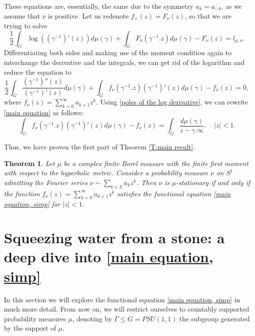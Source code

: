 \documentclass[11pt]{article}
\newtheorem{theorem}{Theorem}[section]
\begin{document}
These equations are, essentially, the same due to the symmetry $a_k = \overline{a_{-k}}$, as we assume that $\nu$ is positive. Let us redenote $f_+(z) = F_\nu(z)$, so that we are trying to solve
\begin{equation}
	\frac{1}{2} \int_G \log((\gamma^{-1})'(z))  d\mu(\gamma) + \int_G F_\nu(\gamma^{-1}.z)  d\mu(\gamma) - F_\nu(z) = l_{\mu, \nu}.
\end{equation}
Differentiating both sides and making use of the moment condition again to interchange the derivative and the integrals, we can get rid of the logarithm and reduce the equation to
\begin{equation}
	\label{main equation}
	\frac{1}{2} \int_G \frac{(\gamma^{-1})''(z)}{(\gamma^{-1})'(z)}  d\mu(\gamma) + \int_G f_\nu(\gamma^{-1}.z)(\gamma^{-1})'(z)  d\mu(\gamma) - f_\nu(z) = 0,
\end{equation}
where $f_\nu(z) = \sum_{k=0}^{\infty} a_{k+1} z^k$.
Using \eqref{poles of the log derivative}, we can rewrite \eqref{main equation} as follows:
\begin{equation}
	\label{main equation, simp}
	\int_G f_\nu(\gamma^{-1}.z)(\gamma^{-1})'(z)  d\mu(\gamma) - f_\nu(z) = \int_G \frac{d \mu(\gamma)}{z - \gamma.\infty}, \quad |z| < 1.
\end{equation}

Thus, we have proven the first part of Theorem \ref{T:main result}.

\begin{theorem}
	Let $\mu$ be a complex finite Borel measure with the finite first moment with respect to the hyperbolic metric. Consider a probability measure $\nu$ on $S^1$ admitting the Fourier series $\nu \sim \sum_{k \in \mathbb{Z}} a_k z^k$. Then $\nu$ is $\mu$-stationary if and only if the function $f_\nu(z) = \sum_{k=0}^\infty a_{k+1} z^k$ satisfies the functional equation \eqref{main equation, simp} for $|z| < 1$.
\end{theorem}


\section{Squeezing water from a stone: a deep dive into \eqref{main equation, simp}}
\label{Squeezing water from a stone}
In this section we will explore the functional equation \eqref{main equation, simp} in much more detail. From now on, we will restrict ourselves to countably supported probability measures $\mu$, denoting by $\Gamma \le G = PSU(1,1)$ the subgroup generated by the support of $\mu$.
\end{document}
